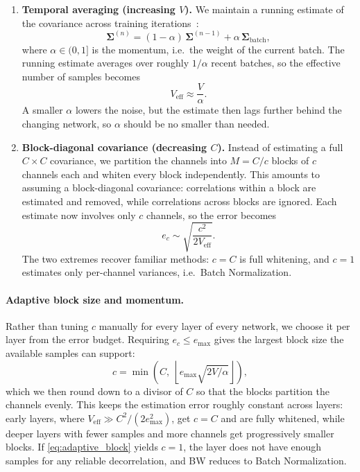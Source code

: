 \begin{enumerate}
    \item \textbf{Temporal averaging (increasing $V$).}
    We maintain a running estimate of the covariance across training iterations~\cite{desjardins2015natural}:
    \begin{equation*}
    \boldsymbol{\Sigma}^{(n)} = (1-\alpha)\, \boldsymbol{\Sigma}^{(n-1)} + \alpha\, \boldsymbol{\Sigma}_{\text{batch}},
    \end{equation*}
    where $\alpha \in (0,1]$ is the momentum, i.e.\ the weight of the current batch.
    The running estimate averages over roughly $1/\alpha$ recent batches, so the effective number of samples becomes
    \begin{equation*}
    V_{\text{eff}} \approx \frac{V}{\alpha}.
    \end{equation*}
    A smaller $\alpha$ lowers the noise, but the estimate then lags further behind the changing network, so $\alpha$ should be no smaller than needed.

    \item \textbf{Block-diagonal covariance (decreasing $C$).}
    Instead of estimating a full $C \times C$ covariance, we partition the channels into $M = C/c$ blocks of $c$ channels each and whiten every block independently.
    This amounts to assuming a block-diagonal covariance: correlations within a block are estimated and removed, while correlations across blocks are ignored.
    Each estimate now involves only $c$ channels, so the error becomes
    \begin{equation*}
    e_c \sim \sqrt{\frac{c^2}{2V_{\text{eff}}}}.
    \end{equation*}
    The two extremes recover familiar methods: $c = C$ is full whitening, and $c = 1$ estimates only per-channel variances, i.e.\ Batch Normalization.
\end{enumerate}

\paragraph{Adaptive block size and momentum.}
Rather than tuning $c$ manually for every layer of every network, we choose it per layer from the error budget.
Requiring $e_c \le e_{\max}$ gives the largest block size the available samples can support:
\begin{equation}
c = \min\!\left(C,\ \left\lfloor e_{\max} \sqrt{2 V / \alpha} \right\rfloor \right),
\label{eq:adaptive_block}
\end{equation}
which we then round down to a divisor of $C$ so that the blocks partition the channels evenly.
This keeps the estimation error roughly constant across layers: early layers, where $V_{\text{eff}} \gg C^2/(2e_{\max}^2)$, get $c = C$ and are fully whitened, while deeper layers with fewer samples and more channels get progressively smaller blocks.
If \eqref{eq:adaptive_block} yields $c = 1$, the layer does not have enough samples for any reliable decorrelation, and BW reduces to Batch Normalization.

